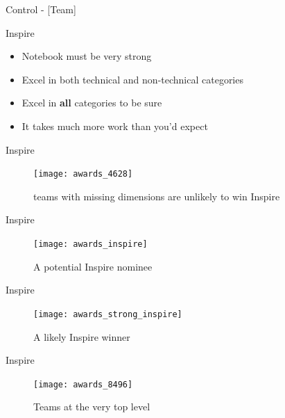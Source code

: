 \documentclass{beamer}
\begin{document}
  \begin{frame}{Control - [Team]}
  \end{frame}

  \begin{frame}{Inspire}
    \begin{itemize}
    \item Notebook must be very strong \pause
    \item Excel in both technical and non-technical categories \pause
    \item Excel in \textbf{all} categories to be sure \pause
    \item It takes much more work than you'd expect
    \end{itemize}
  \end{frame}

  \begin{frame}{Inspire}
    \begin{center}
      \begin{figure}
        \texttt{[image: awards\_4628]}
        \caption{teams with missing dimensions are unlikely to win Inspire}
        \label{}
      \end{figure}
    \end{center}
  \end{frame}

  \begin{frame}{Inspire}
    \begin{center}
      \begin{figure}
        \texttt{[image: awards\_inspire]}
        \caption{A potential Inspire nominee}
      \end{figure}
    \end{center}
  \end{frame}

  \begin{frame}{Inspire}
    \begin{center}
      \begin{figure}
        \texttt{[image: awards\_strong\_inspire]}
        \caption{A likely Inspire winner}
      \end{figure}
    \end{center}
  \end{frame}

  \begin{frame}{Inspire}
    \begin{center}
      \begin{figure}
        \texttt{[image: awards\_8496]}
        \caption{Teams at the very top level}
      \end{figure}
    \end{center}
  \end{frame}
\end{document}
